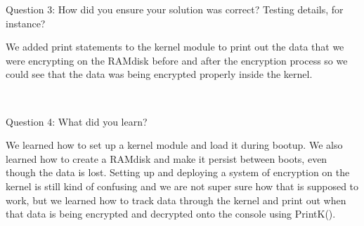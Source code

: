 \documentclass[10pt,journal,onecolumn,compsoc]{IEEEtran}
\begin{document}
\noindent Question 3: How did you ensure your solution was correct? Testing details, for instance?\par 
We added print statements to the kernel module to print out the data that we were encrypting on the RAMdisk before and after the encryption process so we could see that the data was being encrypted properly inside the kernel.  \par ~

\noindent Question 4: What did you learn?\par
We learned how to set up a kernel module and load it during bootup. We also learned how to create a RAMdisk and make it persist between boots, even though the data is lost. Setting up and deploying a system of encryption on the kernel is still kind of confusing and we are not super sure how that is supposed to work, but we learned how to track data through the kernel and print out when that data is being encrypted and decrypted onto the console using PrintK(). \par
\end{document}
